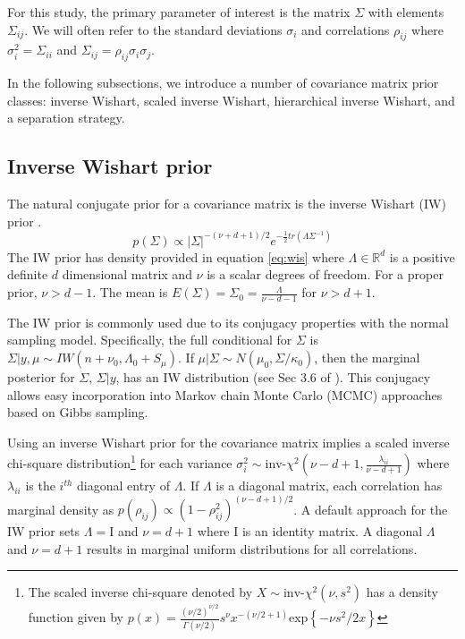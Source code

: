 \documentclass[12pt]{article}
\newcommand{\I}{\mathrm{I}}
\begin{document}
For this study, the primary parameter of interest is the matrix $\Sigma$ with elements $\Sigma_{ij}$. We will often refer to the standard deviations $\sigma_i$ and correlations $\rho_{ij}$ where $\sigma_i^2 = \Sigma_{ii}$ and $\Sigma_{ij} = \rho_{ij}\sigma_i\sigma_j$. 

In the following subsections, we introduce a number of covariance matrix prior classes: inverse Wishart, scaled inverse Wishart, hierarchical inverse Wishart, and a separation strategy. %

\subsection{Inverse Wishart prior \label{sec:iw}}

The natural conjugate prior for a covariance matrix is the inverse Wishart (IW) prior \citep{barnard2000}. 
\begin{equation} 
p(\Sigma) \propto  |\Sigma|^{-(\nu+ d +1)/2 } e^{-\frac{1}{2} tr( \Lambda \Sigma^{-1}) }
\label{eq:wis}
\end{equation}
The IW prior has density provided in equation \eqref{eq:wis} where $\Lambda\in \mathbb{R}^d$ is a positive definite $d$ dimensional matrix and $\nu$ is a scalar degrees of freedom. For a proper prior, $\nu>d-1$. The mean is $E(\Sigma) = \Sigma_0= \frac{\Lambda}{\nu - d - 1}$ for $\nu>d+1$. 

The IW prior is commonly used due to its conjugacy properties with the normal sampling model. Specifically, the full conditional for $\Sigma$ is $\Sigma \vert y,\mu \sim IW(n+\nu_0, \Lambda_0+S_\mu)$. If $\mu|\Sigma \sim N(\mu_0,\Sigma/\kappa_0)$, then the marginal posterior for $\Sigma$, $\Sigma|y$, has an IW distribution (see Sec 3.6 of \cite{bda2013}). This conjugacy allows easy incorporation into Markov chain Monte Carlo (MCMC) approaches based on Gibbs sampling.

Using an inverse Wishart prior for the covariance matrix implies a scaled inverse chi-square distribution\footnote{The scaled inverse chi-square denoted by $X \sim \mbox{inv-}\chi^2(\nu, s^2)$ has a density function given by $p(x) =  \frac{(\nu/2)^{\nu/2}} {\Gamma(\nu/2)} s^{\nu}x^{-(\nu/2 + 1)} \mbox{exp}\left\{-\nu s^2 / 2x\right\} $} for each variance $\sigma_i^2\sim \mbox{inv-}\chi^2(\nu - d + 1, \frac{\lambda_{ii}}{\nu-d+1} )$ where $\lambda_{ii}$ is the $i^{th}$ diagonal entry of $\Lambda$. If $\Lambda$ is a diagonal matrix, each correlation has marginal density as $p(\rho_{ij}) \propto (1 - \rho_{ij}^2)^{(\nu - d + 1)/2}$. A default approach for the IW prior sets $\Lambda=\I$ and $\nu=d+1$ where $\I$ is an identity matrix. A diagonal $\Lambda$ and $\nu=d+1$ results in marginal uniform distributions for all correlations. 
\end{document}
